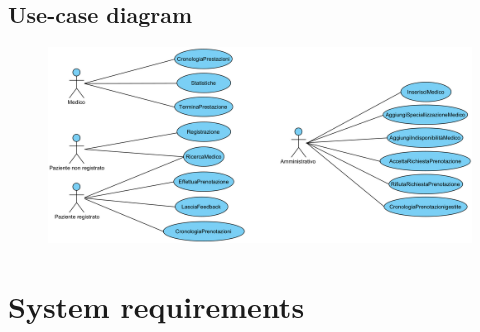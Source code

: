 \documentclass[12pt]{report}
\begin{document}
    \subsection{Use-case diagram}
    \begin{figure}[H]
        \centering
        \includegraphics[width=1\linewidth]{images/Use-Case prenotazionimediche.png}
        \label{Use-case diagram}
    \end{figure}

    \newpage

    \section{System requirements}
\end{document}
